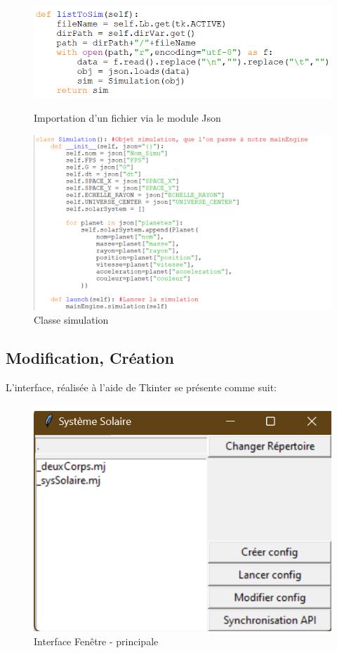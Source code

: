 \documentclass[a4paper, 12pt]{article}
\begin{document}
	
	\begin{figure}[H]
    	\centering
    	\begin{minipage}{0.5\linewidth}
        	\centering
        	\includegraphics[width=\linewidth]{toJson.png}
        	\caption{\label{fig:TOJSON} Importation d'un fichier via le module Json}
    	\end{minipage}
    	\hspace{0.05\linewidth}  %
    	\begin{minipage}{0.38\linewidth}
        	\centering
        	\includegraphics[width=\linewidth]{simulationClasse.png}
        	\caption{\label{fig:simClasse} Classe simulation} 
    	\end{minipage}
	\end{figure}
%
%
\subsection{Modification, Création}
	L'interface, réalisée à l'aide de Tkinter se présente comme suit:
    \begin{figure}[H]
		\centering
		\includegraphics[width=0.2\linewidth]{mainInterface.png}
		\caption{\label{fig: IntMain} Interface Fenêtre - principale}  
	\end{figure}
\end{document}
